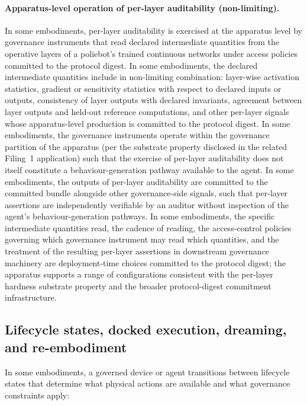 \documentclass[a4paper,12pt]{article}
\begin{document}
\paragraph{Apparatus-level operation of per-layer auditability
  (non-limiting).}
In some embodiments, per-layer auditability is exercised at the
apparatus level by governance instruments that read declared
intermediate quantities from the operative layers of a poliebot's
trained continuous networks under access policies committed to the
protocol digest. In some embodiments, the declared intermediate
quantities include in non-limiting combination: layer-wise activation
statistics, gradient or sensitivity statistics with respect to
declared inputs or outputs, consistency of layer outputs with
declared invariants, agreement between layer outputs and held-out
reference computations, and other per-layer signals whose
apparatus-level production is committed to the protocol digest. In
some embodiments, the governance instruments operate within the
governance partition of the apparatus (per the substrate property
disclosed in the related Filing~1 application) such that the
exercise of per-layer auditability does not itself constitute a
behaviour-generation pathway available to the agent. In some
embodiments, the outputs of per-layer auditability are committed
to the committed bundle alongside other governance-side signals,
such that per-layer assertions are independently verifiable by an
auditor without inspection of the agent's behaviour-generation
pathways. In some embodiments, the specific intermediate quantities
read, the cadence of reading, the access-control policies governing
which governance instrument may read which quantities, and the
treatment of the resulting per-layer assertions in downstream
governance machinery are deployment-time choices committed to the
protocol digest; the apparatus supports a range of configurations
consistent with the per-layer hardness substrate property and the
broader protocol-digest commitment infrastructure.

\subsection{Lifecycle states, docked execution, dreaming, and
  re-embodiment}
\label{sec:lifecycle}

In some embodiments, a governed device or agent transitions between
lifecycle states that determine what physical actions are available and
what governance constraints apply:
\end{document}
